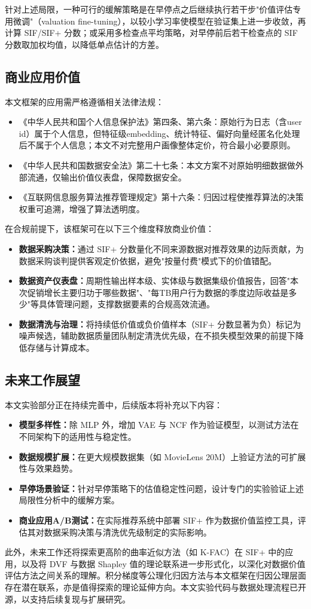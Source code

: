 针对上述局限，一种可行的缓解策略是在早停点之后继续执行若干步"价值评估专用微调"（valuation fine-tuning），以较小学习率使模型在验证集上进一步收敛，再计算 SIF/SIF+ 分数；或采用多检查点平均策略，对早停前后若干检查点的 SIF 分数取加权均值，以降低单点估计的方差。

\subsection{商业应用价值}

本文框架的应用需严格遵循相关法律法规：
\begin{itemize}
    \item 《中华人民共和国个人信息保护法》第四条、第六条：原始行为日志（含user id）属于个人信息，但特征级embedding、统计特征、偏好向量经匿名化处理后不属于个人信息；本文不对完整用户画像整体定价，符合最小必要原则。
    \item 《中华人民共和国数据安全法》第二十七条：本文方案不对原始明细数据做外部流通，仅输出价值仪表盘，保障数据安全。
    \item 《互联网信息服务算法推荐管理规定》第十六条：归因过程使推荐算法的决策权重可追溯，增强了算法透明度。
\end{itemize}

在合规前提下，该框架可在以下三个维度释放商业价值：

\begin{itemize}
    \item \textbf{数据采购决策：}通过 SIF+ 分数量化不同来源数据对推荐效果的边际贡献，为数据采购谈判提供客观定价依据，避免"按量付费"模式下的价值错配。
    \item \textbf{数据资产仪表盘：}周期性输出样本级、实体级与数据集级价值报告，回答"本次促销增长主要归功于哪些数据"、"每TB用户行为数据的季度边际收益是多少"等具体管理问题，支撑数据要素的合规高效流通。
    \item \textbf{数据清洗与治理：}将持续低价值或负价值样本（SIF+ 分数显著为负）标记为噪声候选，辅助数据质量团队制定清洗优先级，在不损失模型效果的前提下降低存储与计算成本。
\end{itemize}

\subsection{未来工作展望}
本文实验部分正在持续完善中，后续版本将补充以下内容：
\begin{itemize}
    \item \textbf{模型多样性：}除 MLP 外，增加 VAE 与 NCF 作为验证模型，以测试方法在不同架构下的适用性与稳定性。
    \item \textbf{数据规模扩展：}在更大规模数据集（如 MovieLens 20M）上验证方法的可扩展性与效果趋势。
    \item \textbf{早停场景验证：}针对早停策略下的估值稳定性问题，设计专门的实验验证上述局限性分析中的缓解方案。
    \item \textbf{商业应用A/B测试：}在实际推荐系统中部署 SIF+ 作为数据价值监控工具，评估其对数据采购决策与清洗优先级制定的实际影响。
\end{itemize}

此外，未来工作还将探索更高阶的曲率近似方法（如 K-FAC）在 SIF+ 中的应用，以及将 DVF 与数据 Shapley 值的理论联系进一步形式化，以深化对数据价值评估方法之间关系的理解。积分梯度等公理化归因方法\cite{sundararajan2017axiomatic}与本文框架在归因公理层面存在潜在联系，亦是值得探索的理论延伸方向。本文实验代码与数据处理流程已开源\cite{repository}，以支持后续复现与扩展研究。

